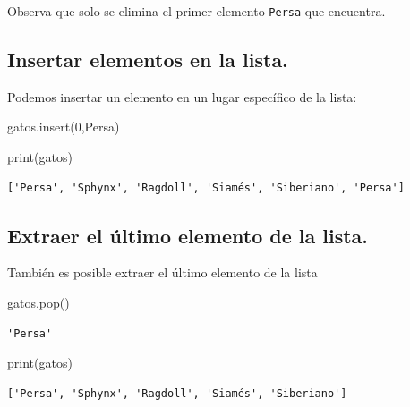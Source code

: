 \documentclass[
  spanish,
  letterpaper,
]{scrbook}
\newenvironment{Shaded}{\begin{snugshade}}{\end{snugshade}}
\newcommand{\BuiltInTok}[1]{\textcolor[rgb]{0.00,0.23,0.31}{#1}}
\newcommand{\DecValTok}[1]{\textcolor[rgb]{0.68,0.00,0.00}{#1}}
\newcommand{\NormalTok}[1]{\textcolor[rgb]{0.00,0.23,0.31}{#1}}
\newcommand{\StringTok}[1]{\textcolor[rgb]{0.13,0.47,0.30}{#1}}
\theoremstyle{definition}
\theoremstyle{remark}
\begin{document}
Observa que solo se elimina el primer elemento \texttt{Persa} que
encuentra.

\subsection{Insertar elementos en la
lista.}\label{insertar-elementos-en-la-lista.}

Podemos insertar un elemento en un lugar específico de la lista:

\begin{Shaded}
\begin{Highlighting}[]
\NormalTok{gatos.insert(}\DecValTok{0}\NormalTok{,}\StringTok{\textquotesingle{}Persa\textquotesingle{}}\NormalTok{)}
\end{Highlighting}
\end{Shaded}

\begin{Shaded}
\begin{Highlighting}[]
\BuiltInTok{print}\NormalTok{(gatos)}
\end{Highlighting}
\end{Shaded}

\begin{verbatim}
['Persa', 'Sphynx', 'Ragdoll', 'Siamés', 'Siberiano', 'Persa']
\end{verbatim}

\subsection{Extraer el último elemento de la
lista.}\label{extraer-el-uxfaltimo-elemento-de-la-lista.}

También es posible extraer el último elemento de la lista

\begin{Shaded}
\begin{Highlighting}[]
\NormalTok{gatos.pop() }
\end{Highlighting}
\end{Shaded}

\begin{verbatim}
'Persa'
\end{verbatim}

\begin{Shaded}
\begin{Highlighting}[]
\BuiltInTok{print}\NormalTok{(gatos)}
\end{Highlighting}
\end{Shaded}

\begin{verbatim}
['Persa', 'Sphynx', 'Ragdoll', 'Siamés', 'Siberiano']
\end{verbatim}
\end{document}
